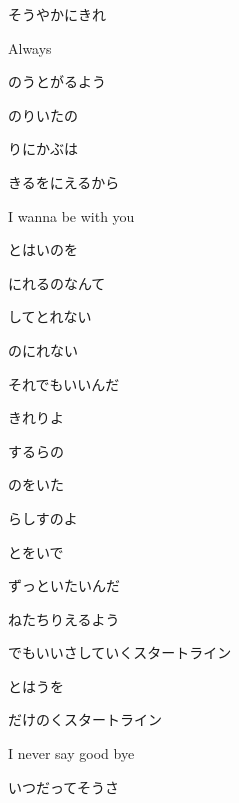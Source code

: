 \documentclass[14pt]{ltjsarticle}
\begin{document}
{  そうやかにきれ
  \jisho{}

  Always
  \jisho{}

\item
  のうとがるよう
  \jisho{}

  のりいたの
  \jisho{}

  りにかぶは
  \jisho{}

  きるをにえるから
  \jisho{}

  I wanna be with you
  \jisho{}

\item
  とはいのを
  \jisho{}

  にれるのなんて
  \jisho{}

  してとれない
  \jisho{}

  のにれない
  \jisho{}

  それでもいいんだ
  \jisho{}

  きれりよ
  \jisho{}

  するらの
  \jisho{}

  のをいた
  \jisho{}

  らしすのよ
  \jisho{}

  とをいで
  \jisho{}

  ずっといたいんだ
  \jisho{}

\item
  ねたちりえるよう
  \jisho{}

  でもいいさしていくスタートライン
  \jisho{}

  とはうを
  \jisho{}

  だけのくスタートライン
  \jisho{}

  I never say good bye
  \jisho{}

  いつだってそうさ
  \jisho{}

}
\end{document}

